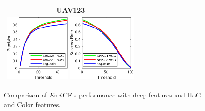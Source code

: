 \documentclass[10pt,twocolumn,letterpaper]{article}
\begin{document}
\begin{figure}[t]
\begin{tabular}{ccc}
\tiny\quad\quad\quad\textbf{UAV123}\\
\includegraphics[width=3.30cm]{./figures/pr_deep.eps}
\includegraphics[width=3.50cm]{./figures/sr_deep.eps}\\
\end{tabular}
\caption{Comparison of {\it E}nKCF's performance with deep features and HoG and Color features.}
\label{fig:UAV123_DATASET_DeepFeatures}
\end{figure}

\end{document}

